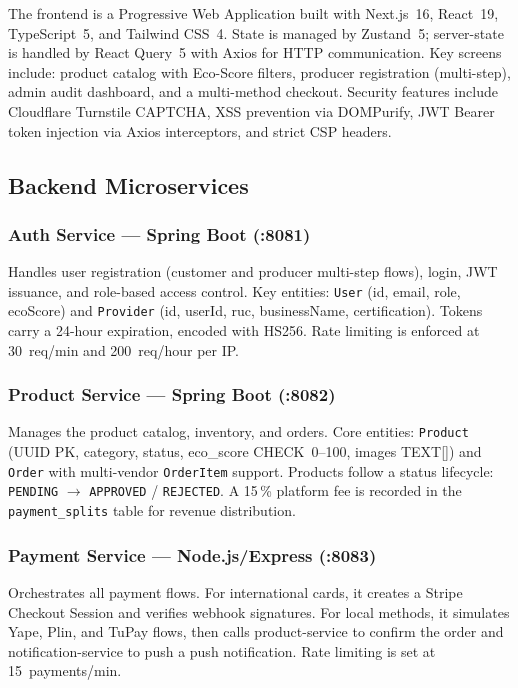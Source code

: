 \documentclass[10pt,a4paper,twocolumn]{article}
\begin{document}
The frontend is a Progressive Web Application built with
Next.js~16, React~19, TypeScript~5, and Tailwind CSS~4.
State is managed by Zustand~5; server-state is handled by
React Query~5 with Axios for HTTP communication.
Key screens include: product catalog with Eco-Score filters,
producer registration (multi-step), admin audit dashboard,
and a multi-method checkout. Security features include
Cloudflare Turnstile CAPTCHA, XSS prevention via DOMPurify,
JWT Bearer token injection via Axios interceptors, and
strict CSP headers.

\subsection{Backend Microservices}

\subsubsection{Auth Service — Spring Boot (:8081)}

Handles user registration (customer and producer multi-step flows),
login, JWT issuance, and role-based access control.
Key entities: \texttt{User} (id, email, role, ecoScore) and
\texttt{Provider} (id, userId, ruc, businessName, certification).
Tokens carry a 24-hour expiration, encoded with HS256.
Rate limiting is enforced at 30~req/min and 200~req/hour per IP.

\subsubsection{Product Service — Spring Boot (:8082)}

Manages the product catalog, inventory, and orders.
Core entities: \texttt{Product} (UUID PK, category, status,
eco\_score CHECK~0--100, images TEXT[]) and \texttt{Order}
with multi-vendor \texttt{OrderItem} support.
Products follow a status lifecycle: \texttt{PENDING}
$\rightarrow$ \texttt{APPROVED} / \texttt{REJECTED}.
A 15\,\% platform fee is recorded in the
\texttt{payment\_splits} table for revenue distribution.

\subsubsection{Payment Service — Node.js/Express (:8083)}

Orchestrates all payment flows. For international cards, it creates
a Stripe Checkout Session and verifies webhook signatures. For local
methods, it simulates Yape, Plin, and TuPay flows, then calls
product-service to confirm the order and notification-service to
push a push notification. Rate limiting is set at 15~payments/min.
\end{document}

